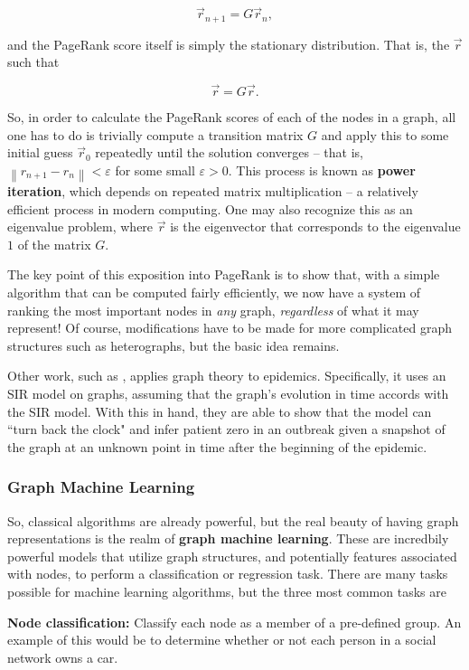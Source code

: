 \documentclass{article}
\theoremstyle{definition}
\newcommand{\norm}[1]{\left\lVert#1\right\rVert}
\begin{document}
\[
\Vec{r}_{n+1} = G \Vec{r}_n,
\]

and the PageRank score itself is simply the stationary distribution. That is, the $\Vec{r}$ such that

\[
\Vec{r} = G \Vec{r}.
\]

So, in order to calculate the PageRank scores of each of the nodes in a graph, all one has to do is trivially compute a transition matrix $G$ and apply this to some initial guess $\Vec{r}_0$ repeatedly until the solution converges -- that is, $\norm{r_{n+1} - r_{n}} < \varepsilon$ for some small $\varepsilon > 0$. This process is known as \textbf{power iteration}, which depends on repeated matrix multiplication -- a relatively efficient process in modern computing. One may also recognize this as an eigenvalue problem, where $\Vec{r}$ is the eigenvector that corresponds to the eigenvalue $1$ of the matrix $G$.

The key point of this exposition into PageRank is to show that, with a simple algorithm that can be computed fairly efficiently, we now have a system of ranking the most important nodes in \textit{any} graph, \textit{regardless} of what it may represent! Of course, modifications have to be made for more complicated graph structures such as heterographs, but the basic idea remains.

Other work, such as \cite{PhysRevLetterBayesianInferenceNetworksBeliefProp}, applies graph theory to epidemics. Specifically, it uses an SIR model \cite{SIRmodel} on graphs, assuming that the graph's evolution in time accords with the SIR model. With this in hand, they are able to show that the model can ``turn back the clock" and infer patient zero in an outbreak given a snapshot of the graph at an unknown point in time after the beginning of the epidemic.

\subsubsection{Graph Machine Learning}

So, classical algorithms are already powerful, but the real beauty of having graph representations is the realm of \textbf{graph machine learning}. These are incredbily powerful models that utilize graph structures, and potentially features associated with nodes, to perform a classification or regression task. There are many tasks possible for machine learning algorithms, but the three most common tasks are

\textbf{Node classification:} Classify each node as a member of a pre-defined group. An example of this would be to determine whether or not each person in a social network owns a car.
\end{document}
